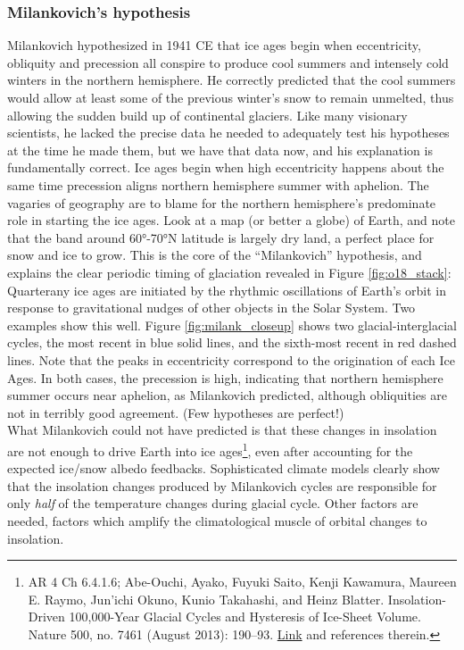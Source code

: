 \documentclass[amstex,12pt]{book}
\begin{document}
\subsubsection{Milankovich's hypothesis}
Milankovich hypothesized in 1941 CE that ice ages begin when eccentricity, obliquity and precession all conspire to produce cool summers and intensely cold winters in the northern hemisphere. He correctly predicted that the cool summers would allow at least some of the previous winter's snow to remain unmelted, thus allowing the sudden build up of continental glaciers. Like many visionary scientists, he lacked the precise data he needed to adequately test his hypotheses at the time he made them, but we have that data now, and his explanation is fundamentally correct. Ice ages begin when high eccentricity happens about the same time precession aligns northern hemisphere summer with aphelion. The vagaries of geography are to blame for the northern hemisphere's predominate role in starting the ice ages. Look at a map (or better a globe) of Earth, and note that the band around \ang{60}-\ang{70}N latitude is largely dry land, a perfect place for snow and ice to grow. This is the core of the ``Milankovich'' hypothesis, and explains the clear periodic timing of glaciation revealed in Figure \ref{fig:o18_stack}: Quarterany ice ages are initiated by the rhythmic oscillations of Earth's orbit in response to gravitational nudges of other objects in the Solar System.  Two examples show this well. Figure \ref{fig:milank_closeup} shows two glacial-interglacial cycles, the most recent in blue solid lines, and the sixth-most recent in red dashed lines. Note that the peaks in eccentricity correspond to the origination of each Ice Ages. In both cases, the precession is high, indicating that northern hemisphere summer occurs near aphelion, as Milankovich predicted, although obliquities are not in terribly good agreement. (Few hypotheses are perfect!)\\

What Milankovich could not have predicted is that these changes in insolation are not enough to drive Earth into ice ages\footnote{AR 4 Ch 6.4.1.6; Abe-Ouchi, Ayako, Fuyuki Saito, Kenji Kawamura, Maureen E. Raymo, Jun’ichi Okuno, Kunio Takahashi, and Heinz Blatter. Insolation-Driven 100,000-Year Glacial Cycles and Hysteresis of Ice-Sheet Volume. Nature 500, no. 7461 (August 2013): 190–93. \href{https://doi.org/10.1038/nature12374}{Link} and references therein.}, even after accounting for the expected ice/snow albedo feedbacks. Sophisticated climate models clearly show that the insolation changes produced by Milankovich cycles are responsible for only \emph{half} of the temperature changes during  glacial cycle. Other factors are needed, factors which amplify the climatological muscle of orbital changes to insolation.\\
	
\end{document}
